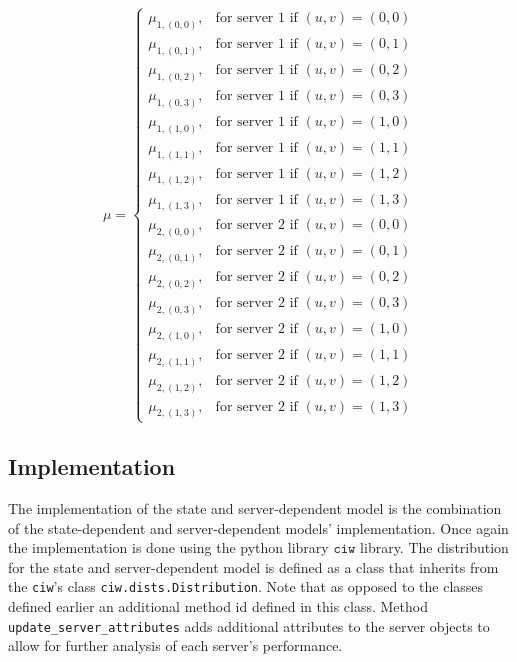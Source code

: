 \begin{equation}\label{eq:state_server_dependent_service_rate_example}
    \mu =
    \begin{cases}
        \mu_{1, (0,0)}, & \text{for server } 1 \text{ if } (u, v) = (0, 0) \\
        \mu_{1, (0,1)}, & \text{for server } 1 \text{ if } (u, v) = (0, 1) \\
        \mu_{1, (0,2)}, & \text{for server } 1 \text{ if } (u, v) = (0, 2) \\
        \mu_{1, (0,3)}, & \text{for server } 1 \text{ if } (u, v) = (0, 3) \\
        \mu_{1, (1,0)}, & \text{for server } 1 \text{ if } (u, v) = (1, 0) \\
        \mu_{1, (1,1)}, & \text{for server } 1 \text{ if } (u, v) = (1, 1) \\
        \mu_{1, (1,2)}, & \text{for server } 1 \text{ if } (u, v) = (1, 2) \\
        \mu_{1, (1,3)}, & \text{for server } 1 \text{ if } (u, v) = (1, 3) \\
        \mu_{2, (0,0)}, & \text{for server } 2 \text{ if } (u, v) = (0, 0) \\
        \mu_{2, (0,1)}, & \text{for server } 2 \text{ if } (u, v) = (0, 1) \\
        \mu_{2, (0,2)}, & \text{for server } 2 \text{ if } (u, v) = (0, 2) \\
        \mu_{2, (0,3)}, & \text{for server } 2 \text{ if } (u, v) = (0, 3) \\
        \mu_{2, (1,0)}, & \text{for server } 2 \text{ if } (u, v) = (1, 0) \\
        \mu_{2, (1,1)}, & \text{for server } 2 \text{ if } (u, v) = (1, 1) \\
        \mu_{2, (1,2)}, & \text{for server } 2 \text{ if } (u, v) = (1, 2) \\
        \mu_{2, (1,3)}, & \text{for server } 2 \text{ if } (u, v) = (1, 3)
    \end{cases}
\end{equation}


\subsection{Implementation}

The implementation of the state and server-dependent model is the
combination of the state-dependent and server-dependent models' implementation.
Once again the implementation is done using the python library \(\texttt{ciw}\)
library.
The distribution for the state and server-dependent model is defined as a
class that inherits from the \texttt{ciw}'s class
\texttt{ciw.dists.Distribution}.
Note that as opposed to the classes defined earlier an additional method id
defined in this class.
Method \texttt{update\_server\_attributes} adds additional attributes to the
server objects to allow for further analysis of each server's performance.

